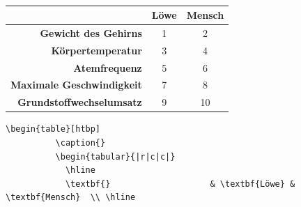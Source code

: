 \documentclass["WS\space 16-17\space -\space LaTeX-Kurs\space -\space Praesentation\space -\space 2.tex"]{subfiles}
\begin{document}
\begin{frame}[fragile]
    \vspace{-0.2cm}
    \Losung
    \vspace{-0.1cm}
	\begin{outputbox}
        \vspace{-0.4cm}
		\begin{center}
            \begin{table}[htbp]
                \caption{}
                \vspace{-0.4cm}
                \begin{tabular}{|r|c|c|}
                    \hline 
                    \textbf{}                         & \textbf{Löwe} & \textbf{Mensch}  \\ \hline 
                    \textbf{Gewicht des Gehirns}      & 1             & 2                \\ \hline 
                    \textbf{Körpertemperatur}         & 3             & 4                \\ \hline 
                    \textbf{Atemfrequenz}             & 5             & 6                \\ \hline 
                    \textbf{Maximale Geschwindigkeit} & 7             & 8                \\ \hline 
                    \textbf{Grundstoffwechselumsatz}  & 9             & 10               \\ \hline
                \end{tabular} 
                \label{}
            \end{table}
		\end{center}
        \vspace{-0.4cm}
	\end{outputbox}
    \vspace{-0.2cm}
    \Code
    \vspace{-0.1cm}
	\begin{lstlisting}[gobble=8]
        \begin{table}[htbp]
          \caption{}
          \begin{tabular}{|r|c|c|}
            \hline 
            \textbf{}                    & \textbf{Löwe} & \textbf{Mensch}  \\ \hline 

\end{lstlisting}
\end{frame}
\end{document}
